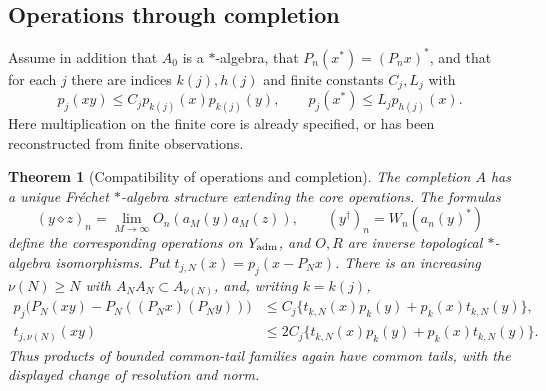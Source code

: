 \documentclass[11pt,a4paper]{amsart}
\numberwithin{equation}{section}
\newtheorem{theorem}{Theorem}[section]
\theoremstyle{definition}
\theoremstyle{remark}
\begin{document}
\subsection{Operations through completion}
Assume in addition that $A_0$ is a $*$-algebra, that $P_n(x^*)=(P_nx)^*$, and that for each $j$ there are indices $k(j),h(j)$ and finite constants $C_j,L_j$ with
\begin{equation}\label{eq:abstractproduct}
 p_j(xy)\le C_jp_{k(j)}(x)p_{k(j)}(y),\qquad
 p_j(x^*)\le L_jp_{h(j)}(x).
\end{equation}
Here multiplication on the finite core is already specified, or has been reconstructed from finite observations.

\begin{theorem}[Compatibility of operations and completion]\label{thm:operationcompletion}
The completion $A$ has a unique Fr\'echet $*$-algebra structure extending the core operations. The formulas
\begin{equation}\label{eq:dataproduct}
 (y\diamond z)_n=\lim_{M\to\infty}O_n(a_M(y)a_M(z)),
 \qquad (y^\dagger)_n=W_n(a_n(y)^*)
\end{equation}
define the corresponding operations on $Y_{\rm adm}$, and $O,R$ are inverse topological $*$-algebra isomorphisms. Put $t_{j,N}(x)=p_j(x-P_Nx)$. There is an increasing $\nu(N)\ge N$ with $A_NA_N\subset A_{\nu(N)}$, and, writing $k=k(j)$,
\begin{align}
 p_j\big(P_N(xy)-P_N((P_Nx)(P_Ny))\big)
 &\le C_j\{t_{k,N}(x)p_k(y)+p_k(x)t_{k,N}(y)\},\label{eq:truncdefect}\\
 t_{j,\nu(N)}(xy)
 &\le2C_j\{t_{k,N}(x)p_k(y)+p_k(x)t_{k,N}(y)\}.\label{eq:tailproduct}
\end{align}
Thus products of bounded common-tail families again have common tails, with the displayed change of resolution and norm.
\end{theorem}
\end{document}
